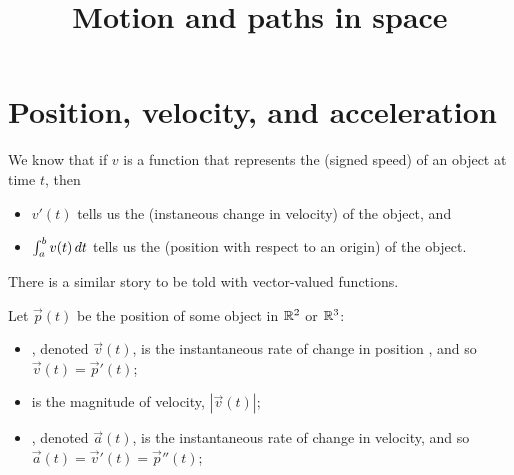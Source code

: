 \documentclass{ximera}
\title[Dig-In:]{Motion and paths in space}
\begin{document}
\begin{abstract}
\end{abstract}
\maketitle

\section{Position, velocity, and acceleration}

We know that if $v$ is a function that represents the 
(signed speed) of an object at time $t$, then
\begin{itemize}
\item $v'(t)$ tells us the  (instaneous change in
  velocity) of the object, and
\item $\int_a^b v(t) \mathop{}\!d t$ tells us the  (position
  with respect to an origin) of the object.
\end{itemize}

There is a similar story to be told with vector-valued functions.

\begin{definition}
Let $\vec{p}(t)$ be the position of some object in $\mathbb R^2$ or $\mathbb R^3$:
\begin{itemize}
\item {}, denoted $\vec{v}(t)$, is the instantaneous rate
  of change in position , and so $\vec{v}(t) = \vec{p}'(t)$;
\item {} is the magnitude of velocity, $|\vec v(t)|$;
\item {}, denoted $\vec{a}(t)$, is the instantaneous
  rate of change in velocity, and so $\vec a(t) = \vec{v}'(t) =
  \vec{p}''(t)$;
\end{itemize}
\end{definition}
\end{document}
